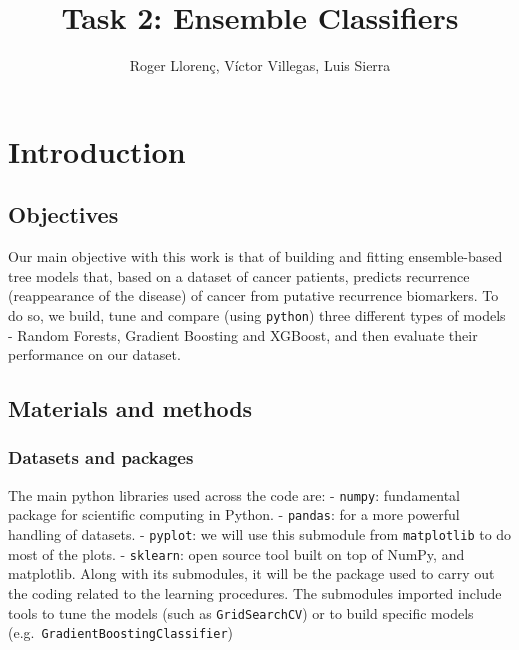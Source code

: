 \documentclass[11pt]{article}
\title{Task 2: Ensemble Classifiers}
\author{Roger Llorenç, Víctor
Villegas, Luis Sierra}
\begin{document}
    
    \maketitle

    \tableofcontents
    
    \hypertarget{introduction}{%
\section{Introduction}\label{introduction}}

    \hypertarget{objectives}{%
\subsection{Objectives}\label{objectives}}

    Our main objective with this work is that of building and fitting
ensemble-based tree models that, based on a dataset of cancer patients,
predicts recurrence (reappearance of the disease) of cancer from
putative recurrence biomarkers. To do so, we build, tune and compare
(using \texttt{python}) three different types of models - Random
Forests, Gradient Boosting and XGBoost, and then evaluate their
performance on our dataset.

    \hypertarget{materials-and-methods}{%
\subsection{Materials and methods}\label{materials-and-methods}}

    \hypertarget{Datasets-and-packages}{%
\subsubsection{Datasets and
packages}\label{mm1.-datasets-and-packages}}

    The main python libraries used across the code are: - \texttt{numpy}:
fundamental package for scientific computing in Python. -
\texttt{pandas}: for a more powerful handling of datasets. -
\texttt{pyplot}: we will use this submodule from \texttt{matplotlib} to
do most of the plots. - \texttt{sklearn}: open source tool built on top
of NumPy, and matplotlib. Along with its submodules, it will be the
package used to carry out the coding related to the learning procedures.
The submodules imported include tools to tune the models (such as
\texttt{GridSearchCV}) or to build specific models
(e.g.~\texttt{GradientBoostingClassifier})
\end{document}
